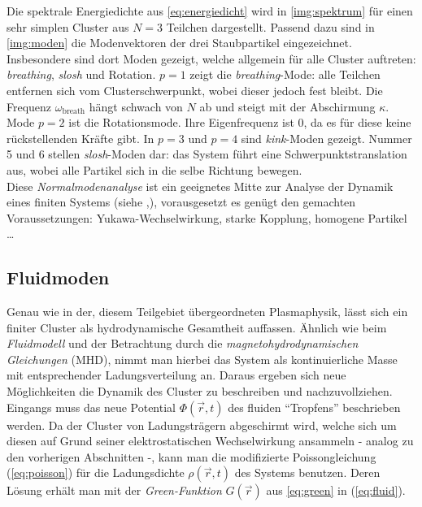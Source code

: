 \documentclass[numbers=noenddot,a4paper,notitlepage,twoside,BCOR15mm]{scrbook}
\newcommand{\ix}[1]{_\text{#1}}
\newcommand{\tilt}[1]{\textit{#1}}
\begin{document}
					Die spektrale Energiedichte aus \autoref{eq:energiedicht} wird in \autoref{img:spektrum} für einen sehr simplen Cluster aus $N=3$ Teilchen dargestellt. Passend dazu sind in \autoref{img:moden} die Modenvektoren der drei Staubpartikel eingezeichnet. Insbesondere sind dort Moden gezeigt, welche allgemein für alle Cluster auftreten: \tilt{breathing}, \tilt{slosh} und Rotation. $p=1$ zeigt die \tilt{breathing}-Mode: alle Teilchen entfernen sich vom Clusterschwerpunkt, wobei dieser jedoch fest bleibt. Die Frequenz $\omega\ix{breath}$ hängt schwach von $N$ ab und steigt mit der Abschirmung $\kappa$. Mode $p=2$ ist die Rotationsmode. Ihre Eigenfrequenz ist $0$, da es für diese keine rückstellenden Kräfte gibt. In $p=3$ und $p=4$ sind \tilt{kink}-Moden gezeigt. Nummer 5 und 6 stellen \tilt{slosh}-Moden dar: das System führt eine Schwerpunktstranslation aus, wobei alle Partikel sich in die selbe Richtung bewegen.\\
					Diese \tilt{Normalmodenanalyse} ist ein geeignetes Mitte zur Analyse der Dynamik eines finiten Systems (siehe \cite{Melzer01},\cite{Melzer03}), vorausgesetzt es genügt den gemachten Voraussetzungen: Yukawa-Wechselwirkung, starke Kopplung, homogene Partikel \dots

				\subsection*{Fluidmoden}

					Genau wie in der, diesem Teilgebiet übergeordneten Plasmaphysik, lässt sich ein finiter Cluster als hydrodynamische Gesamtheit auffassen. Ähnlich wie beim \tilt{Fluidmodell} und der Betrachtung durch die \tilt{magnetohydrodynamischen Gleichungen} (MHD), nimmt man hierbei das System als kontinuierliche Masse mit entsprechender Ladungsverteilung an. Daraus ergeben sich neue Möglichkeiten die Dynamik des Cluster zu beschreiben und nachzuvollziehen.\\
					Eingangs muss das neue Potential $\Phi\left(\vec{r},t\right)$ des fluiden "`Tropfens"' beschrieben werden. Da der Cluster von Ladungsträgern abgeschirmt wird, welche sich um diesen auf Grund seiner elektrostatischen Wechselwirkung ansammeln - analog zu den vorherigen Abschnitten -, kann man die modifizierte Poissongleichung (\autoref{eq:poisson}) für die Ladungsdichte $\rho\left(\vec{r},t\right)$ des Systems benutzen. Deren Lösung erhält man mit der \tilt{Green-Funktion} $G\left(\vec{r}\right)$ aus \autoref{eq:green} in (\ref{eq:fluid}). 
\end{document}
